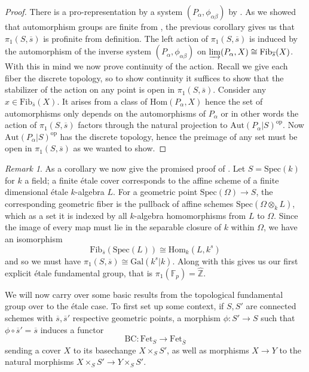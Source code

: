 \documentclass{article}
\theoremstyle{definition}
\theoremstyle{remark}
\newtheorem*{remark}{Remark}
\theoremstyle{plain}
\newcommand{\Z}{\mathbb{Z}}
\begin{document}
\begin{proof}
	There is a pro-representation by a system $(P_{\alpha}, \phi_{\alpha \beta})$  by .
	As we showed that automorphism groups are finite from , the previous corollary gives us that $\pi_1(S, \overline{s})$ is profinite from definition.
	The left action of $\pi_1(S, \overline{s})$ is induced by the automorphism of the inverse system $(P_{\alpha}, \phi_{\alpha \beta})$ on $\varinjlim(P_{\alpha}, X) \cong \text{Fib}_{\overline{s}}(X)$.\\	
\indent 	With this in mind we now prove continuity of the action.
Recall we give each fiber the discrete topology, so to show continuity it suffices to show that the stabilizer of the action on any point is open in $\pi_1(S, \overline{s})$.
	Consider any $x \in \text{Fib}_{\overline{s}}(X)$. 
	It arises from a class of $\text{Hom}(P_{\alpha}, X)$ hence the set of automorphisms only depends on the automorphisms of $P_{\alpha}$ or in other words the action of $\pi_1(S, \overline{s}) $ factors through the natural projection to $\text{Aut}(P_{\alpha}|S)^{\text{op}}$.
	Now $\text{Aut}(P_{\alpha}|S)^{\text{op}}$ has the discrete topology, hence the preimage of any set must be open in $\pi_1(S, \overline{s})$ as we wanted to show.
 \end{proof}

\begin{remark}


As a corollary we now give the promised proof of .
Let $S = \text{Spec}(k)$ for $k$ a field; a finite \'etale cover corresponds to the affine scheme of a finite dimensional \'etale $k$-algebra $L$.
For a geometric point $\text{Spec}(\Omega) \to S$, the corresponding geometric fiber is the pullback of affine schemes $\text{Spec}(\Omega \otimes_k L)$, which as a set it is indexed by all $k$-algebra homomorphisms from $L$ to $\Omega$.
Since the image of every map must lie in the separable closure of $k$ within $\Omega$, we have an isomorphism 
\[\text{Fib}_{\overline{s}}(\text{Spec}(L)) \cong \text{Hom}_k(L, k^s)\]
and so we must have $\pi_1(S, \overline{s}) \cong \text{Gal}(k^s|k)$.
Along with  this gives us our first explicit \'etale fundamental group, that is $\pi_1(\mathbb{F}_p) = \widehat{\Z}$.
\end{remark}

	We will now carry over some basic results from the topological fundamental group over to the \'etale case.
	To first set up some context, if $S, S'$ are connected schemes with $\overline{s}, \overline{s}'$ respective geometric points, a morphism $\phi: S' \to S$ such that $\phi \circ \overline{s}' = \overline{s}$ induces a functor
\[\text{BC}: \text{Fet}_S \to \text{Fet}_{\overline{S}}\]
sending a cover $X$ to its basechange $X \times_S S'$, as well as morphisms $X \to Y$ to the natural morphisms $X \times_S S' \to Y \times_S S'$.
\end{document}
